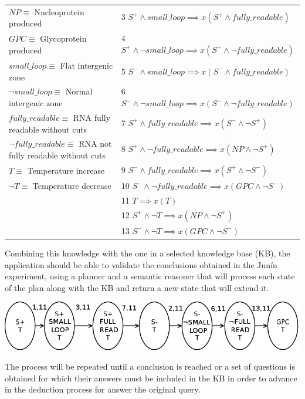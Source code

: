 \documentclass[portrait,final,a0paper,fontscale=0.277]{baposter}
\begin{document}
\begin{poster}
{{{\begin{tabular}{l l}
	$NP\equiv$ Nucleoprotein produced 		
	& 3  $S^{+}\wedge small\_loop\implies x(S^{+}\wedge fully\_readable)$\\
	$GPC\equiv$ Glycoprotein produced 		
	& 4  $S^{+}\wedge\neg small\_loop\implies x(S^{+}\wedge\neg fully\_readable)$\\
	$small\_loop\equiv$ Flat intergenic zone 
	& 5  $S^{-}\wedge small\_loop\implies x(S^{-}\wedge fully\_readable)$\\
	$\neg small\_loop\equiv$ Normal intergenic zone 
	& 6  $S^{-}\wedge\neg small\_loop\implies x(S^{-}\wedge\neg fully\_readable)$\\
	$fully\_readable\equiv$ RNA fully readable without cuts 
	& 7  $S^{+}\wedge fully\_readable\implies x(S^{-}\wedge\neg S^{+})$\\
	$\neg fully\_readable\equiv$ RNA not fully readable without cuts 
	& 8  $S^{+}\wedge\neg fully\_readable\implies x(NP\wedge\neg S^{+})$\\
	$T\equiv$ Temperature increase
	& 9  $S^{-}\wedge fully\_readable\implies x(S^{+}\wedge\neg S^{-})$ \\
	$\neg T\equiv$ Temperature decrease 
	& 10 $S^{-}\wedge\neg fully\_readable\implies x(GPC\wedge\neg S^{-})$\\
	& 11 $T\implies x(T)$\\
	& 12 $S^{+}\wedge\neg T\implies x(NP\wedge\neg S^{+})$\\
	& 13 $S^{-}\wedge\neg T\implies x(GPC\wedge\neg S^{-})$\\
	\end{tabular}
    }
    \begin{flushleft}
	Combining this knowledge with the one in a selected knowledge base (KB), 
	the application should be able to validate the conclusions obtained 
	in the Junín experiment\cite{Junin}, using a planner and a semantic 
	reasoner that will process each state of the plan along with the KB and 
	return a new state that will extend it.
	\end{flushleft}
    \begin{center}
	\includegraphics[width=0.85\linewidth]{1st_approach_1}
	\end{center}
	\begin{flushleft}
	The process will be repeated until a conclusion is reached or a set of questions 
	is obtained for which their answers must be included in the KB in order 
	to advance in the deduction process for answer the original query.
	\end{flushleft}
	}
   }
   

\end{poster}
\end{document}
